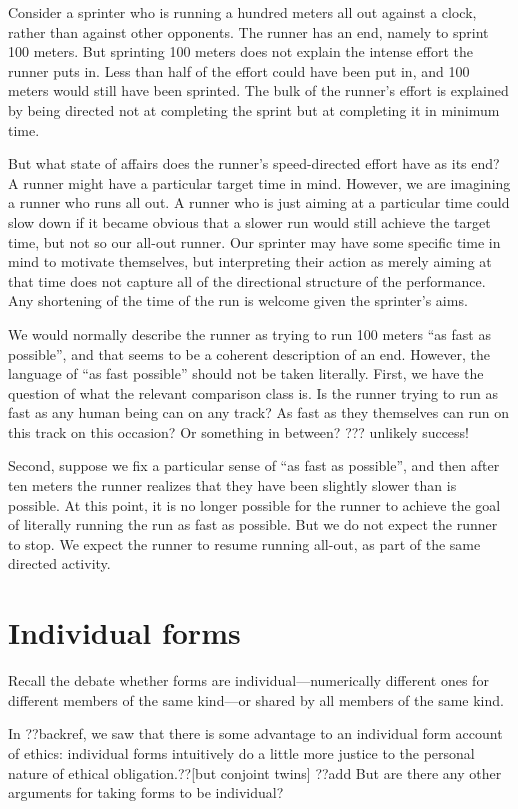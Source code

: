 Consider a sprinter who is running a hundred meters all out against a clock, rather than against other opponents. The runner has an end, 
namely to sprint 100 meters. But sprinting 100 meters does not explain the intense effort the runner puts in. Less than half of the effort 
could have been put in, and 100 meters would still have been sprinted. The bulk of the runner's effort is explained by being directed 
not at completing the sprint but at completing it in minimum time.

But what state of affairs does the runner's speed-directed effort have as its end? A runner might have a particular target time in mind.
However, we are imagining a runner who runs all out. A runner who is just aiming at a particular time could slow down if it became obvious
that a slower run would still achieve the target time, but not so our all-out runner. Our sprinter may have some specific time in mind
to motivate themselves, but interpreting their action as merely aiming at that time does not capture all of the directional structure 
of the performance. Any shortening of the time of the run is welcome given the sprinter's aims. 

We would normally describe the runner as trying to run 100 meters ``as fast as possible'', and that seems to be a coherent description
of an end. However, the language of ``as fast possible'' should not be taken literally. First, we have the question of what the relevant
comparison class is. Is the runner trying to run as fast as any human being can on any track? As fast as they themselves can run on this
track on this occasion? Or something in between? ??? unlikely success!

Second, suppose we fix a particular sense of ``as fast as possible'', and then after ten meters the runner realizes that they have
been slightly slower than is possible. At this point, it is no longer possible for the runner to achieve the goal of literally running
the run as fast as possible. But we do not expect the runner to stop. We expect the runner to resume running all-out, as part of the
same directed activity.

\section{Individual forms}
Recall the debate whether forms are individual---numerically different ones for different members of the same kind---or shared
by all members of the same kind.

In ??backref, we saw that there is some advantage to an individual form account of ethics: individual forms intuitively do 
a little more justice to the personal nature of ethical obligation.??[but conjoint twins] ??add 
But are there any other arguments for taking forms to be individual?

